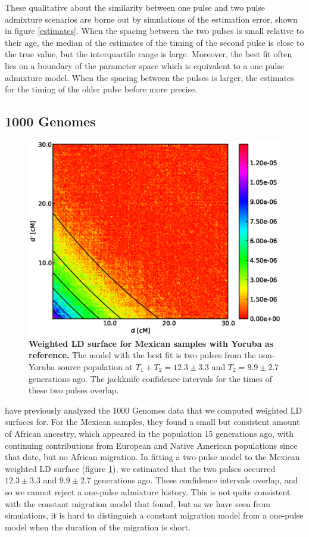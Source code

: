 These qualitative about the similarity between one pulse and two pulse admixture scenarios are borne out by simulations of the estimation error, shown in figure \ref{estimates}. When the spacing between the two pulses is small relative to their age, the median of the estimates of the timing of the second pulse is close to the true value, but the interquartile range is large. Moreover, the best fit often lies on a boundary of the parameter space which is equivalent to a one pulse admixture model. When the spacing between the pulses is larger, the estimates for the timing of the older pulse before more precise.
\subsection{1000 Genomes}
\begin{figure}
\includegraphics[scale=.6]{MXL.eps}
\caption{
{\bf Weighted LD surface for Mexican samples with Yoruba as reference.} The model with the best fit is two pulses from the non-Yoruba source population at $T_1+T_2=12.3 \pm 3.3$ and $T_2=9.9\pm 2.7$ generations ago. The jackknife confidence intervals for the times of these two pulses overlap. 
}
\label{ASH_MXL}
\end{figure}

\cite{gravel2013reconstructing} have previously analyzed the 1000 Genomes data that we computed weighted LD surfaces for. For the Mexican samples, they found a small but consistent amount of African ancestry, which appeared in the population 15 generations ago, with continuing contributions from European and Native American populations since that date, but no African migration. In fitting a two-pulse model to the Mexican weighted LD surface (figure \ref{ASH_MXL}), we estimated that the two pulses occurred $12.3\pm3.3$ and $9.9\pm2.7$ generations ago. These confidence intervals overlap, and so we cannot reject a one-pulse admixture history. This is not quite consistent with the constant migration model that \cite{gravel2013reconstructing} found, but as we have seen from simulations, it is hard to distinguish a constant migration model from a one-pulse model when the duration of the migration is short.

